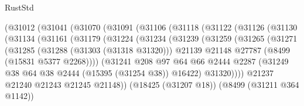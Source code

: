 \begin{lexlean}{RustStd}
\begin{coremodule}
                    (@31012
                      (@31041
                        (@31070
                          (@31091
                            (@31106
                              (@31118
                                (@31122
                                  (@31126
                                    (@31130
                                      (@31134
                                        (@31161
                                          (@31179
                                            (@31224
                                              (@31234
                                                (@31239
                                                  (@31259
                                                    (@31265
                                                      (@31271
                                                        (@31285
                                                          (@31288 (@31303 (@31318 @31320)))
                                                          @21139
                                                          @21148
                                                          @27787
                                                          (@8499 (@15831 @5377 @2268))))
                                                      (@31241
                                                        @208
                                                        @97
                                                        @64
                                                        @66
                                                        @2444
                                                        @2287
                                                        (@31249
                                                          @38
                                                          @64
                                                          @38
                                                          @2444
                                                          (@15395 (@31254 @38))
                                                          @16422)
                                                        @31320))))
                                                @21237
                                                @21240
                                                @21243
                                                @21245
                                                @21148))
                                            (@18425 (@31207 @18))
                                            (@8499 (@31211 @364 @1142))

\end{coremodule}
\end{lexlean}
